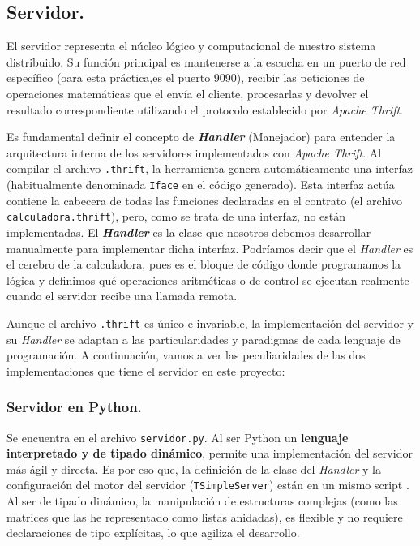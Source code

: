 \documentclass[a4paper,12pt]{article}
\begin{document}
		\subsection{Servidor.}
			El servidor representa el núcleo lógico y computacional de nuestro sistema distribuido. Su función principal es mantenerse a la escucha en un puerto de red específico (oara esta práctica,es el puerto 9090), recibir las peticiones de operaciones matemáticas que el envía el cliente, procesarlas y devolver el resultado correspondiente utilizando el protocolo establecido por \textit{Apache Thrift}.
			
			Es fundamental definir el concepto de \textbf{\textit{Handler}} (Manejador) para entender la arquitectura interna de los servidores implementados con \textit{Apache Thrift}.  Al compilar el archivo \texttt{.thrift}, la herramienta genera automáticamente una interfaz (habitualmente denominada \texttt{Iface} en el código generado). Esta interfaz actúa contiene la  cabecera de todas las funciones declaradas en el contrato (el archivo \texttt{calculadora.thrift}), pero, como se trata de una interfaz, no están implementadas. El \textit{\textbf{Handler}} es la clase que nosotros debemos desarrollar manualmente para implementar dicha interfaz. Podríamos decir que el \textit{Handler} es el cerebro de la calculadora, pues es el bloque de código donde programamos la lógica y definimos qué operaciones aritméticas o de control se ejecutan realmente cuando el servidor recibe una llamada remota.
			
			Aunque el archivo \texttt{.thrift} es único e invariable, la implementación del servidor y su \textit{Handler} se adaptan a las particularidades y paradigmas de cada lenguaje de programación. A continuación, vamos a ver las peculiaridades de las dos implementaciones que tiene el servidor en este proyecto:
		
			\subsubsection{Servidor en Python.}
				Se encuentra en el archivo \texttt{servidor.py}. Al ser Python un \textbf{lenguaje interpretado y de tipado dinámico}, permite una implementación del servidor más ágil y directa.	Es por eso que, la definición de la clase del \textit{Handler} y la configuración del motor del servidor (\texttt{TSimpleServer}) están en un mismo script . Al ser de tipado dinámico, la manipulación de estructuras complejas (como las matrices que las he representado como listas anidadas), es flexible y no requiere declaraciones de tipo explícitas, lo que agiliza el desarrollo.
				
\end{document}
